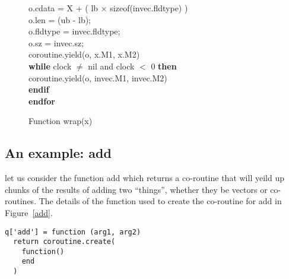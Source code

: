\begin{figure}
{\begin{minipage}{20cm}
\begin{tabbing}
  o.cdata = X + ( lb \(\times\) sizeof(invec.fldtype) ) \\
  o.len   = (ub - lb); \\ 
  o.fldtype = invec.fldtype; \\
  o.sz = invec.sz; \\
  coroutine.yield(o, x.M1, x.M2) \\
{\bf while} clock \(\neq\) nil and clock \(<\) 0 {\bf then} \+ \\
  coroutine.yield(o, invec.M1, invec.M2) \- \\
{\bf endif} \- \\
{\bf endfor} 
\end{tabbing}
\end{minipage}
}
\label{wrap}
\caption{Function wrap(x)}
\end{figure}

\subsection{An example: add} 
\label{example_add}

let us consider the function add which returns a co-routine that will yeild up
chunks of the results of adding two ``things'', whether they be vectors or
co-routines. 
The details of the function used to create the co-routine for add in
Figure~\ref{add}. 
\begin{verbatim}
q['add'] = function (arg1, arg2)
  return coroutine.create(
    function()
    end
  )
\end{verbatim}

